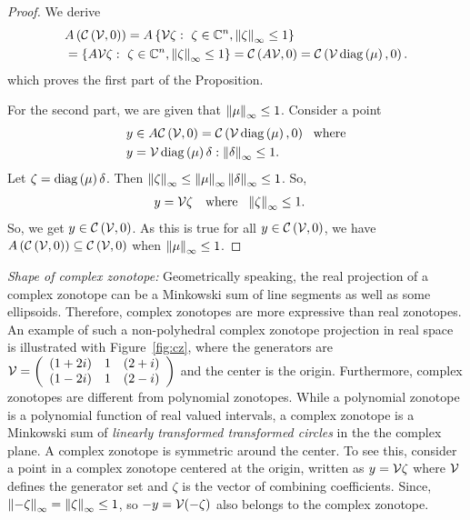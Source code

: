 \begin{proof}
We derive
\begin{align*}
& A\left(\mathit{\mathcal{C}}\left(\mathcal{V},0\right)\right) =
A\left\{\mathcal{V}\zeta:~\zeta\in\mathbb{C}^n,\left\|\zeta\right\|_{\infty}\leq 1\right\}\\
& =\left\{A\mathcal{V}\zeta:~\zeta\in\mathbb{C}^n,\left\|\zeta\right\|_{\infty}\leq 1\right\}
= \mathit{\mathcal{C}}\left(A\mathcal{V},0\right)=\mathit{\mathcal{C}}\left(\mathcal{V}\operatorname{diag}\left(\mu\right),0\right).
\end{align*}
%
which proves the first part of the
Proposition.

For the second part, we are given that $\left\|\mu\right\|_{\infty}\leq 1$.
Consider a point
%
\begin{align*}
  & y\in A\mathit{\mathcal{C}}\left(\mathcal{V},0\right)=\mathit{\mathcal{C}}\left(\mathcal{V}\operatorname{diag}\left(\mu\right),0\right)~~\text{where}\\
  &y = \mathcal{V}\operatorname{diag}\left(\mu\right)\delta:\left\|\delta\right\|_{\infty}\leq
1.
\end{align*}
%
Let $\zeta = \operatorname{diag}\left(\mu\right)\delta$. Then $\left\|\zeta\right\|_{\infty} \leq
\left\|\mu\right\|_{\infty}\left\|\delta\right\|_{\infty} \leq 1$.  So,
%
\begin{align*}
  & y=\mathcal{V}\zeta~~\text{ where }~
  \left\|\zeta\right\|_{\infty}\leq 1.
\end{align*}
%
So, we get $y\in \mathit{\mathcal{C}}\left(\mathcal{V},0\right)$.  As this is true for all
$y\in\mathit{\mathcal{C}}\left(\mathcal{V},0\right)$, we have
$A\left(\mathit{\mathcal{C}}\left(\mathcal{V},0\right)\right)\subseteq
\mathit{\mathcal{C}}\left(\mathcal{V},0\right)$ when $\left\|\mu\right\|_{\infty}\leq 1$.
\end{proof}
%
{\it Shape of complex zonotope:} Geometrically speaking, the real
projection of a complex zonotope can be a Minkowski sum of line
segments as well as some ellipsoids.  Therefore, complex zonotopes are
more expressive than real zonotopes.  An example of such a
non-polyhedral complex zonotope projection in real space is
illustrated with Figure~\ref{fig:cz}, where the generators are
$\mathcal{V}=\left(\begin{array}{lll}(1+2i) & 1 & (2+i)\\(1-2i) & 1 &
  (2-i)\end{array}\right)$ and the center is the origin.  Furthermore,
complex zonotopes are different from polynomial zonotopes.  While a
polynomial zonotope is a polynomial function of real valued intervals,
a complex zonotope is a Minkowski sum of \emph{linearly transformed
  transformed circles} in the the complex plane.  A complex zonotope
is symmetric around the center.  To see this, consider a point in a
complex zonotope centered at the origin, written as $y=\mathcal{V}\zeta$
where $\mathcal{V}$ defines the generator set and $\zeta$ is the vector of
combining coefficients.  Since, $\left\|-\zeta\right\|_{\infty}=\left\|\zeta\right\|_{\infty}\leq
1$, so $-y=\mathcal{V}(-\zeta)$ also belongs to the complex zonotope.


